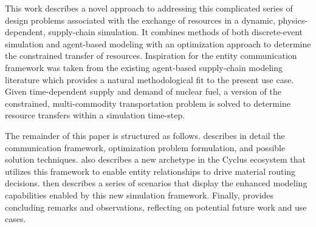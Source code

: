 This work describes a novel approach to addressing this complicated series of
design problems associated with the exchange of resources in a dynamic,
physics-dependent, supply-chain simulation. It combines methods of both
discrete-event simulation and agent-based modeling with an optimization approach
to determine the constrained transfer of resources. Inspiration for the entity
communication framework was taken from the existing agent-based supply-chain
modeling literature
\cite{swaminathan_modeling_1998,julka_agent-based_2002,van_der_zee_modeling_2005,chatfield_multi-formalism_2007,holmgren_agent_2007}
which provides a natural methodological fit to the present use case. Given
time-dependent supply and demand of nuclear fuel, a version of the constrained,
multi-commodity transportation problem is solved to determine resource transfers
within a simulation time-step.


The remainder of this paper is structured as follows. 
describes in detail the communication framework, optimization problem
formulation, and possible solution techniques.  also
describes a new archetype in the Cyclus ecosystem that utilizes this framework
to enable entity relationships to drive material routing
decisions.  then describes a series of scenarios that
display the enhanced modeling capabilities enabled by this new simulation
framework. Finally,  provides concluding remarks and
observations, reflecting on potential future work and use cases.
